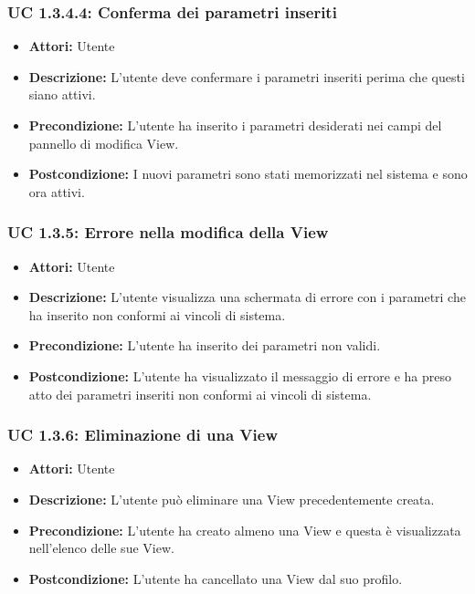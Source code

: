\subsubsection{UC 1.3.4.4: Conferma dei parametri inseriti}

\begin{itemize}
    \item \textbf{Attori:} Utente
    \item \textbf{Descrizione:} L'utente deve confermare i parametri inseriti perima che questi siano attivi.
    \item \textbf{Precondizione:} L'utente ha inserito i parametri desiderati nei campi del pannello di modifica View.
    \item \textbf{Postcondizione:} I nuovi parametri sono stati memorizzati nel sistema e sono ora attivi.
\end{itemize}

\subsubsection{UC 1.3.5: Errore nella modifica della View}

\begin{itemize}
    \item \textbf{Attori:} Utente
    \item \textbf{Descrizione:} L'utente visualizza una schermata di errore con i parametri che ha inserito non conformi ai vincoli di sistema.
    \item \textbf{Precondizione:} L'utente ha inserito dei parametri non validi.
    \item \textbf{Postcondizione:} L'utente ha visualizzato il messaggio di errore e ha preso atto dei parametri inseriti non conformi ai vincoli di sistema.
\end{itemize}

\subsubsection{UC 1.3.6: Eliminazione di una View}

\begin{itemize}
    \item \textbf{Attori:} Utente
    \item \textbf{Descrizione:} L'utente può eliminare una View precedentemente creata.
    \item \textbf{Precondizione:} L'utente ha creato almeno una View e questa è visualizzata nell'elenco delle sue View.
    \item \textbf{Postcondizione:} L'utente ha cancellato una View dal suo profilo.
\end{itemize}

